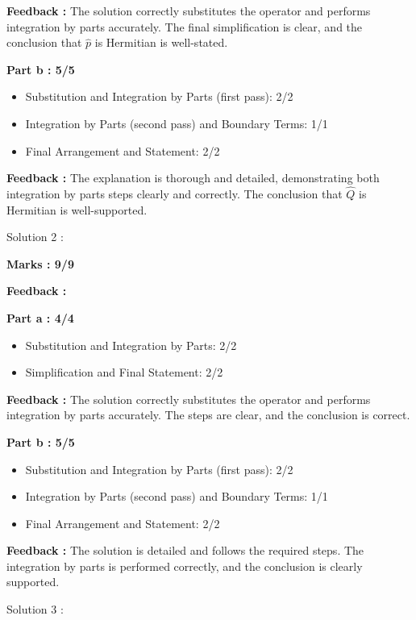 \documentclass[a4paper,11pt]{article}
\begin{document}
\textbf{Feedback :}
The solution correctly substitutes the operator and performs integration by parts accurately. The final simplification is clear, and the conclusion that $\hat{p}$ is Hermitian is well-stated.


\textbf{Part b : 5/5}

\begin{itemize}
    \item Substitution and Integration by Parts (first pass): 2/2
    \item Integration by Parts (second pass) and Boundary Terms: 1/1
    \item Final Arrangement and Statement: 2/2
\end{itemize}

\textbf{Feedback :}
The explanation is thorough and detailed, demonstrating both integration by parts steps clearly and correctly. The conclusion that $\hat{Q}$ is Hermitian is well-supported.




Solution 2 :

\textbf{Marks : 9/9}

\textbf{Feedback :}

\textbf{Part a : 4/4}

\begin{itemize}
    \item Substitution and Integration by Parts: 2/2
    \item Simplification and Final Statement: 2/2
\end{itemize}

\textbf{Feedback :}
The solution correctly substitutes the operator and performs integration by parts accurately. The steps are clear, and the conclusion is correct.


\textbf{Part b : 5/5}

\begin{itemize}
    \item Substitution and Integration by Parts (first pass): 2/2
    \item Integration by Parts (second pass) and Boundary Terms: 1/1
    \item Final Arrangement and Statement: 2/2
\end{itemize}

\textbf{Feedback :}
The solution is detailed and follows the required steps. The integration by parts is performed correctly, and the conclusion is clearly supported.



Solution 3 :
\end{document}
